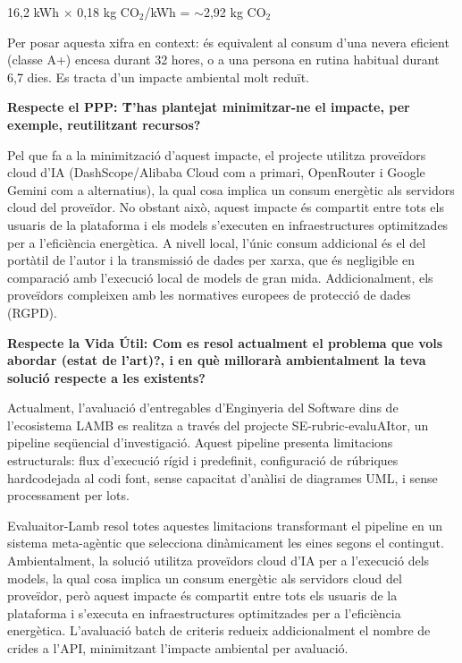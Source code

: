 \documentclass[12pt,a4paper,twoside]{report}
\begin{document}
\begin{center}
16,2 kWh $\times$ 0,18 kg CO$_2$/kWh = $\sim$2,92 kg CO$_2$
\end{center}

Per posar aquesta xifra en context: \'es equivalent al consum d'una nevera eficient (classe A+) encesa durant 32 hores, o a una persona en rutina habitual durant 6,7 dies. Es tracta d'un impacte ambiental molt redu\"it.

\textbf{Respecte el PPP: \'T'has plantejat minimitzar-ne el impacte, per exemple, reutilitzant recursos?}

Pel que fa a la minimitzaci\'o d'aquest impacte, el projecte utilitza prove\"idors cloud d'IA (DashScope/Alibaba Cloud com a primari, OpenRouter i Google Gemini com a alternatius), la qual cosa implica un consum energ\`etic als servidors cloud del prove\"idor. No obstant aix\`o, aquest impacte \'es compartit entre tots els usuaris de la plataforma i els models s'executen en infraestructures optimitzades per a l'efici\`encia energ\`etica. A nivell local, l'\'unic consum addicional \'es el del port\`atil de l'autor i la transmissi\'o de dades per xarxa, que \'es negligible en comparaci\'o amb l'execuci\'o local de models de gran mida. Addicionalment, els prove\"idors compleixen amb les normatives europees de protecci\'o de dades (RGPD).

\textbf{Respecte la Vida \'Util: Com es resol actualment el problema que vols abordar (estat de l'art)?, i en qu\`e millorar\`a ambientalment la teva soluci\'o respecte a les existents?}

Actualment, l'avaluaci\'o d'entregables d'Enginyeria del Software dins de l'ecosistema LAMB es realitza a trav\'es del projecte SE-rubric-evaluAItor, un pipeline seq\"uencial d'investigaci\'o. Aquest pipeline presenta limitacions estructurals: flux d'execuci\'o r\'igid i predefinit, configuraci\'o de r\'ubriques hardcodejada al codi font, sense capacitat d'an\`alisi de diagrames UML, i sense processament per lots.

Evaluaitor-Lamb resol totes aquestes limitacions transformant el pipeline en un sistema meta-ag\`entic que selecciona din\`amicament les eines segons el contingut. Ambientalment, la soluci\'o utilitza prove\"idors cloud d'IA per a l'execuci\'o dels models, la qual cosa implica un consum energ\`etic als servidors cloud del prove\"idor, per\`o aquest impacte \'es compartit entre tots els usuaris de la plataforma i s'executa en infraestructures optimitzades per a l'efici\`encia energ\`etica. L'avaluaci\'o batch de criteris redueix addicionalment el nombre de crides a l'API, minimitzant l'impacte ambiental per avaluaci\'o.
\end{document}
